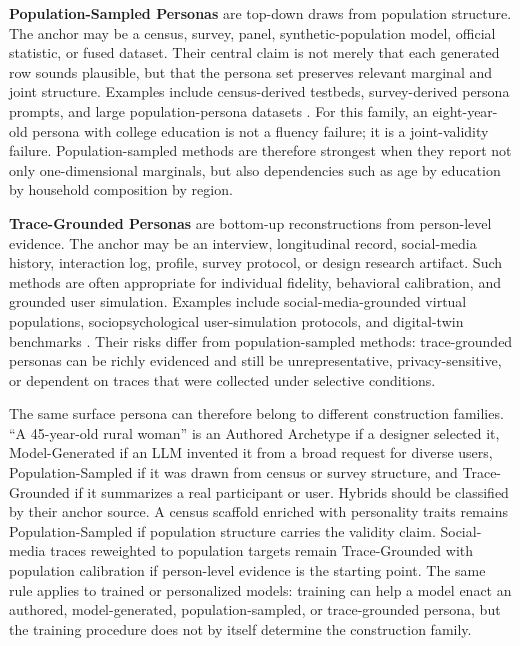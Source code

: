 \textbf{Population-Sampled Personas} are top-down draws from population
structure. The anchor may be a census, survey, panel, synthetic-population
model, official statistic, or fused dataset. Their central claim is not merely
that each generated row sounds plausible, but that the persona set preserves
relevant marginal and joint structure. Examples include census-derived testbeds,
survey-derived persona prompts, and large population-persona datasets
\citep{arxiv240717387,arxiv251121722}.
For this family, an eight-year-old persona with college education is not a
fluency failure; it is a joint-validity failure. Population-sampled methods are
therefore strongest when they report not only one-dimensional marginals, but
also dependencies such as age by education by household composition by region.

\textbf{Trace-Grounded Personas} are bottom-up reconstructions from
person-level evidence. The anchor may be an interview, longitudinal record,
social-media history, interaction log, profile, survey protocol, or design
research artifact. Such methods are often appropriate for individual fidelity,
behavioral calibration, and grounded user simulation. Examples include
social-media-grounded virtual populations, sociopsychological user-simulation
protocols, and digital-twin benchmarks \citep{arxiv250714922,arxiv260107110,arxiv251025536}.
Their risks differ from population-sampled methods: trace-grounded personas can
be richly evidenced and still be unrepresentative, privacy-sensitive, or
dependent on traces that were collected under selective conditions.

The same surface persona can therefore belong to different construction
families. ``A 45-year-old rural woman'' is an Authored Archetype if a designer
selected it, Model-Generated if an LLM invented it from a broad request for
diverse users, Population-Sampled if it was drawn from census or survey
structure, and Trace-Grounded if it summarizes a real participant or user.
Hybrids should be classified by their anchor source. A census scaffold enriched
with personality traits remains Population-Sampled if population structure
carries the validity claim. Social-media traces reweighted to population targets
remain Trace-Grounded with population calibration if person-level evidence is
the starting point. The same rule applies to trained or personalized models:
training can help a model enact an authored, model-generated,
population-sampled, or trace-grounded persona, but the training procedure does
not by itself determine the construction family.

